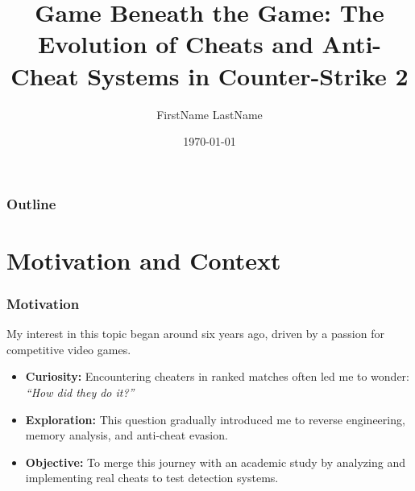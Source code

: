 \documentclass[aspectratio=169]{beamer}
\title[Counter Strike Reversing \& Anti Cheat]{Game Beneath the Game: The Evolution of Cheats and Anti-Cheat Systems in Counter-Strike 2}
\author[LastName F.]{FirstName LastName}
\date{\today}
\begin{document}

\begin{frame}
\end{frame}

\begin{frame}
    \frametitle{Outline}
    \tableofcontents
\end{frame}


\section{Motivation and Context}
\begin{frame}
    \frametitle{Motivation}
    My interest in this topic began around six years ago, driven by a passion for competitive video games.
    \vspace{0.4cm}
    \begin{itemize}
        \item \textbf{Curiosity:} Encountering cheaters in ranked matches often led me to wonder: \textit{“How did they do it?”}
        \pause
        \item \textbf{Exploration:} This question gradually introduced me to reverse engineering, memory analysis, and anti-cheat evasion.
        \pause
        \item \textbf{Objective:} To merge this journey with an academic study by analyzing and implementing real cheats to test detection systems.
    \end{itemize}
\end{frame}
\end{document}
